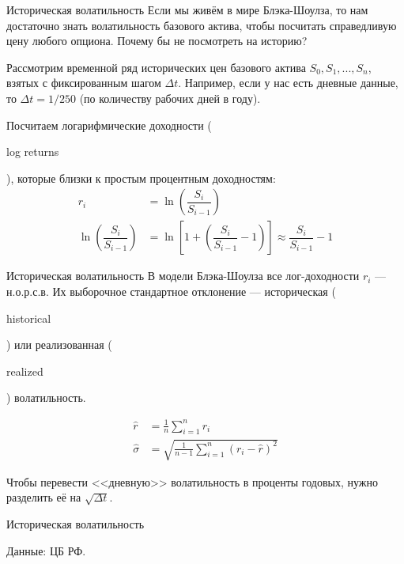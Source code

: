 \documentclass{beamer}
\newcommand{\en}[1]{\begin{otherlanguage}{english}#1\end{otherlanguage}}
\begin{document}
\begin{frame}{Историческая волатильность}
\justify
Если мы живём в мире Блэка-Шоулза, то нам достаточно знать волатильность базового актива, чтобы посчитать справедливую цену любого опциона. Почему бы не посмотреть на историю?

\justify
Рассмотрим временной ряд исторических цен базового актива $S_0,S_1,...,S_n$, взятых с фиксированным шагом $\Delta t$. Например, если у нас есть дневные данные, то $\Delta t = 1/250$ (по количеству рабочих дней в году). 

\justify
Посчитаем логарифмические доходности (\en{log returns}), которые близки к простым процентным доходностям:
\begin{align*}
r_i &= \ln \left( \dfrac{S_{i}}{S_{i-1}} \right) \\
\ln \left(\dfrac{S_{i}}{S_{i-1}} \right) &= \ln \left[1 + \left(\dfrac{S_{i}}{S_{i-1}} - 1 \right) \right] \approx \dfrac{S_{i}}{S_{i-1}} - 1
\end{align*}
\end{frame}



\begin{frame}{Историческая волатильность}
\justify
В модели Блэка-Шоулза все лог-доходности $r_i$ --- н.о.р.с.в. Их выборочное стандартное отклонение --- историческая (\en{historical}) или реализованная (\en{realized}) волатильность.

\begin{align*}
\hat{r} &= \frac{1}{n}\sum\limits_{i=1}^{n}r_i \\
\hat{\sigma} &= \sqrt{\frac{1}{n-1}\sum\limits_{i=1}^{n}(r_i - \hat{r})^2}
\end{align*}

\justify
Чтобы перевести <<дневную>> волатильность в проценты годовых, нужно разделить её на $\sqrt{\Delta t}$.
\end{frame}



\begin{frame}{Историческая волатильность}
\centering
{}

\scriptsize Данные: ЦБ РФ.
\end{frame}
\end{document}
